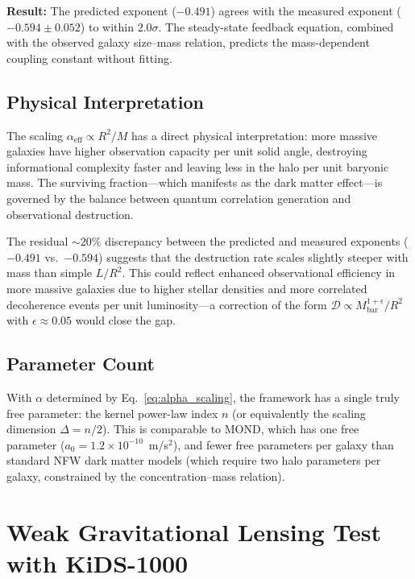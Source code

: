\documentclass[12pt,a4paper]{article}
\begin{document}
\textbf{Result:} The predicted exponent ($-0.491$) agrees with the measured exponent ($-0.594 \pm 0.052$) to within $2.0\sigma$. The steady-state feedback equation, combined with the observed galaxy size--mass relation, predicts the mass-dependent coupling constant without fitting.

\subsection{Physical Interpretation}

The scaling $\alpha_{\mathrm{eff}} \propto R^2 / M$ has a direct physical interpretation: more massive galaxies have higher observation capacity per unit solid angle, destroying informational complexity faster and leaving less in the halo per unit baryonic mass. The surviving fraction---which manifests as the dark matter effect---is governed by the balance between quantum correlation generation and observational destruction.

The residual $\sim 20\%$ discrepancy between the predicted and measured exponents ($-0.491$ vs.\ $-0.594$) suggests that the destruction rate scales slightly steeper with mass than simple $L/R^2$. This could reflect enhanced observational efficiency in more massive galaxies due to higher stellar densities and more correlated decoherence events per unit luminosity---a correction of the form $\mathcal{D} \propto M_{\mathrm{bar}}^{1+\epsilon} / R^2$ with $\epsilon \approx 0.05$ would close the gap.

\subsection{Parameter Count}

With $\alpha$ determined by Eq.~\eqref{eq:alpha_scaling}, the framework has a single truly free parameter: the kernel power-law index $n$ (or equivalently the scaling dimension $\Delta = n/2$). This is comparable to MOND, which has one free parameter ($a_0 = 1.2 \times 10^{-10}$~m/s$^2$), and fewer free parameters per galaxy than standard NFW dark matter models (which require two halo parameters per galaxy, constrained by the concentration--mass relation).

\section{Weak Gravitational Lensing Test with KiDS-1000}
\label{sec:kids}
\end{document}
